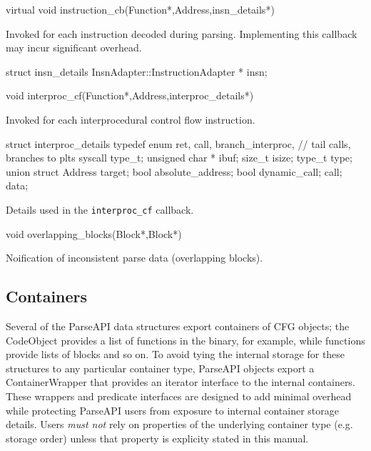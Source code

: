 \documentclass{article}
\newenvironment{apient}{\small\verbatim}{\endverbatim}
\newcommand{\apidesc}[1]{%
{\addtolength{\leftskip}{4em}%
#1\par\medskip}
}
\begin{document}
\begin{apient}
virtual void instruction_cb(Function*,Address,insn_details*)
\end{apient}
\apidesc{Invoked for each instruction decoded during parsing. Implementing this callback may incur significant overhead.}

\begin{apient}
struct insn_details {
    InsnAdapter::InstructionAdapter * insn;
}
\end{apient}

\begin{apient}
void interproc_cf(Function*,Address,interproc_details*)
\end{apient}
\apidesc{Invoked for each interprocedural control flow instruction.}

\begin{apient}  
struct interproc_details {
    typedef enum {
        ret,
        call,
        branch_interproc, // tail calls, branches to plts
        syscall
    } type_t;
    unsigned char * ibuf;
    size_t isize;
    type_t type;
    union {
        struct {
            Address target;
            bool absolute_address;
            bool dynamic_call;
        } call;
    } data;
}
\end{apient}
\apidesc{Details used in the \texttt{interproc\_cf} callback.}

\begin{apient}
void overlapping_blocks(Block*,Block*)
\end{apient}
\apidesc{Noification of inconsistent parse data (overlapping blocks).}

\subsection{Containers}
\label{sec:containers}

Several of the ParseAPI data structures export containers of CFG objects; the
CodeObject provides a list of functions in the binary, for example, while
functions provide lists of blocks and so on. To avoid tying the internal
storage for these structures to any particular container type, ParseAPI objects
export a ContainerWrapper that provides an iterator interface to the internal
containers. These wrappers and predicate interfaces are designed to add minimal
overhead while protecting ParseAPI users from exposure to internal container
storage details. Users \emph{must not} rely on properties of the underlying
container type (e.g. storage order) unless that property is explicity stated in
this manual.
\end{document}
